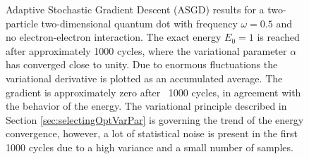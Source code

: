 \begin{figure}[h]
 \begin{center}
  \caption{Adaptive Stochastic Gradient Descent (ASGD) results for a two-particle two-dimensional quantum dot with frequency $\omega=0.5$ and no electron-electron interaction. The exact energy $E_0=1$ is reached after approximately 1000 cycles, where the variational parameter $\alpha$ has converged close to unity. Due to enormous fluctuations the variational derivative is plotted as an accumulated average. The gradient is approximately zero after ~1000 cycles, in agreement with the behavior of the energy. The variational principle described in Section \ref{sec:selectingOptVarPar} is governing the trend of the energy convergence, however, a lot of statistical noise is present in the first 1000 cycles due to a high variance and a small number of samples.}
  \label{fig:ASGD_nonint}
 \end{center}
\end{figure}



